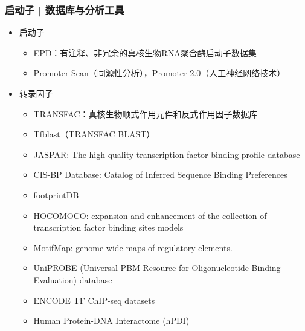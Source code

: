 \begin{frame}
  \frametitle{启动子 | 数据库与分析工具}
  \begin{itemize}
    \item 启动子
      \begin{itemize}
	\item EPD：有注释、非冗余的真核生物RNA聚合酶启动子数据集
        \item Promoter Scan（同源性分析），Promoter 2.0（人工神经网络技术）
      \end{itemize}
    \item 转录因子
      \begin{itemize}
        \item TRANSFAC：真核生物顺式作用元件和反式作用因子数据库
        \item Tfblast（TRANSFAC BLAST）
        \item JASPAR: The high-quality transcription factor binding profile database
        \item CIS-BP Database: Catalog of Inferred Sequence Binding Preferences
        \item footprintDB
        \item HOCOMOCO: expansion and enhancement of the collection of transcription factor binding sites models
        \item MotifMap: genome-wide maps of regulatory elements.
        \item UniPROBE (Universal PBM Resource for Oligonucleotide Binding Evaluation) database
        \item ENCODE TF ChIP-seq datasets
        \item Human Protein-DNA Interactome (hPDI)
      \end{itemize}
  \end{itemize}
\end{frame}

